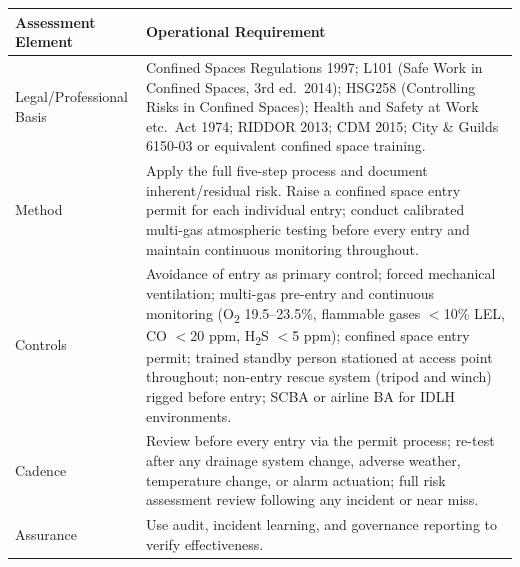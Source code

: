 \begin{table}[H]
\centering
\begin{tabularx}{\textwidth}{>{\raggedright\arraybackslash}p{3.2cm}X}
\toprule
\textbf{Assessment Element} & \textbf{Operational Requirement} \\
\midrule
Legal/Professional Basis & Confined Spaces Regulations 1997; L101 (Safe Work in Confined Spaces, 3rd ed.\ 2014); HSG258 (Controlling Risks in Confined Spaces); Health and Safety at Work etc.\ Act 1974; RIDDOR 2013; CDM 2015; City \& Guilds 6150-03 or equivalent confined space training. \\
Method & Apply the full five-step process and document inherent/residual risk. Raise a confined space entry permit for each individual entry; conduct calibrated multi-gas atmospheric testing before every entry and maintain continuous monitoring throughout. \\
Controls & Avoidance of entry as primary control; forced mechanical ventilation; multi-gas pre-entry and continuous monitoring (O\textsubscript{2} 19.5--23.5\%, flammable gases $<$10\% LEL, CO $<$20 ppm, H\textsubscript{2}S $<$5 ppm); confined space entry permit; trained standby person stationed at access point throughout; non-entry rescue system (tripod and winch) rigged before entry; SCBA or airline BA for IDLH environments. \\
Cadence & Review before every entry via the permit process; re-test after any drainage system change, adverse weather, temperature change, or alarm actuation; full risk assessment review following any incident or near miss. \\
Assurance & Use audit, incident learning, and governance reporting to verify effectiveness. \\
\bottomrule
\end{tabularx}
\end{table}

